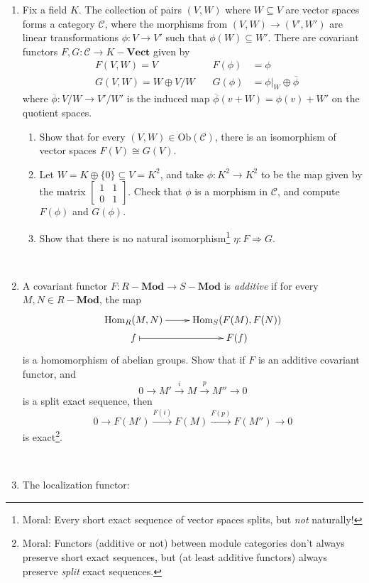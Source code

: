 \documentclass{amsart}[12pt]
\newcommand{\Hom}{\mathrm{Hom}}
\def\sC{\mathscr C}
\numberwithin{equation}{section}
\theoremstyle{plain} %
\theoremstyle{definition}
\theoremstyle{remark}
\newcommand{\xra}[1]{\xrightarrow{#1}}
\newcommand{\Ob}{\mathrm{Ob}}
\newcommand{\Mod}[1]{#1-\mathbf{Mod}}
\newcommand{\Vs}[1]{#1-\mathbf{Vect}}
\begin{document}
\begin{enumerate}
\item Fix a field $K$. The collection of pairs $(V,W)$ where $W\subseteq V$ are vector spaces forms a category $\sC$, where the morphisms from $(V,W)\to(V',W')$ are linear transformations $\phi:V\to V'$ such that $\phi(W)\subseteq W'$. There are covariant functors $F,G:\sC \to \Vs{K}$ given by
\[\begin{aligned} &F(V,W)= V  \quad	&F(\phi)&=\phi \\
&G(V,W) = W\oplus V/W 	\quad	 &G(\phi)&= \phi|_W \oplus \overline{\phi}\end{aligned}\]
where $\overline{\phi}:V/W\to V'/W'$ is the induced map $\overline{\phi}(v+W)=\phi(v) + W'$ on the quotient spaces.
\begin{enumerate}
\item Show that for every $(V,W)\in \Ob(\sC)$, there is an isomorphism of vector spaces $F(V) \cong G(V)$.
\item Let $W=K\oplus \{0\} \subseteq V= K^2$, and take $\phi:K^2 \to K^2$ to be the map given by the matrix $\begin{bmatrix} 1 & 1 \\ 0 & 1\end{bmatrix}$. Check that $\phi$ is a morphism in $\sC$, and compute $F(\phi)$ and $G(\phi)$.
\item Show that there is no natural isomorphism\footnote{Moral: Every short exact sequence of vector spaces splits, but \emph{not} naturally!} $\eta: F\Rightarrow G$.
\end{enumerate}

\

\item A covariant functor $F:\Mod{R} \to \Mod{S}$ is \emph{additive} if for every $M,N\in \Mod{R}$, the map
\[\xymatrix@R=.2em{ \Hom_R(M,N) \ar[r] & \Hom_S(F(M),F(N)) \\ f \ar@{|->}[r] & F(f) }\]
is a homomorphism of abelian groups. Show that if $F$ is an additive covariant functor, and \[ 0 \to M' \xra{i} M \xra{p} M'' \to 0\]
is a split exact sequence, then
\[ 0 \to F(M') \xra{F(i)} F(M) \xra{F(p)} F(M'') \to 0\]
is exact\footnote{Moral: Functors (additive or not) between module categories don't always preserve short exact sequences, but (at least additive functors) always preserve \emph{split} exact sequences.}.

\

\item The localization functor:


\end{enumerate}
\end{document}
